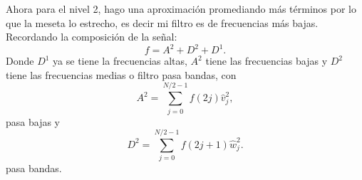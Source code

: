 \begin{paracol}{2}
Ahora para el nivel 2, hago una aproximación promediando más términos por lo que la meseta lo estrecho, es decir mi filtro es de frecuencias más bajas. Recordando la composición de la señal:
$$f = A^2 + D^2 + D^1.$$
Donde $D^1$ ya se tiene la frecuencias altas, $A^2$ tiene las frecuencias bajas y $D^2$ tiene las frecuencias medias o filtro pasa bandas, con
$$A^2=\sum_{j=0}^{N/2-1}f(2j)\hat{v}^2_j,$$ 
pasa bajas y
$$D^2=\sum_{j=0}^{N/2-1}f(2j+1)\hat{w}^2_j.$$
pasa bandas.

\end{paracol}
